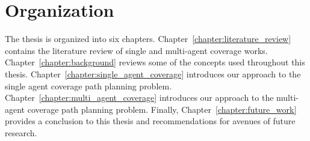 \documentclass[../main.tex]{subfiles}
\begin{document}
\section{Organization}
\label{section:organization}

The thesis is organized into six chapters. Chapter~\ref{chapter:literature_review} contains the literature review of single and multi-agent coverage works. Chapter~\ref{chapter:background} reviews some of the concepts used throughout this thesis. Chapter~\ref{chapter:single_agent_coverage} introduces our approach to the single agent coverage path planning problem. Chapter~\ref{chapter:multi_agent_coverage} introduces our approach to the multi-agent coverage path planning problem. Finally, Chapter~\ref{chapter:future_work} provides a conclusion to this thesis and recommendations for avenues of future research.
\end{document}
